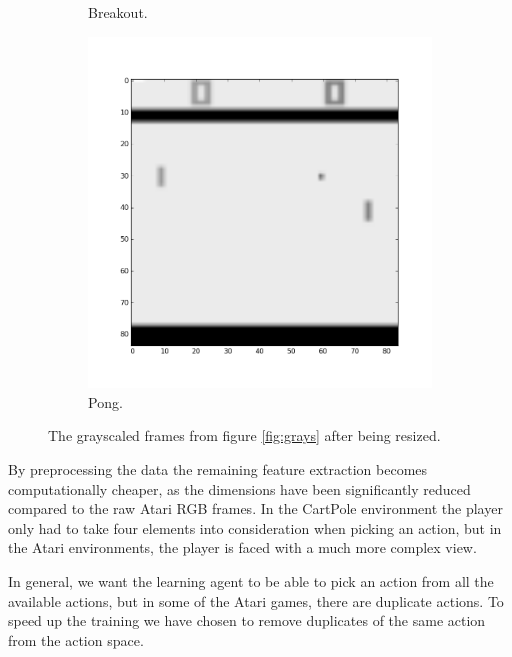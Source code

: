 \documentclass[11pt]{article}
\begin{document}
\begin{figure}[H]
\begin{subfigure}{.3\textwidth}
        \caption{Breakout.}
        \label{fig:scanlike}
    \end{subfigure}
    \begin{subfigure}{.3\textwidth}
        \centering
        \includegraphics[scale=0.23]{include/pong_1_gray_resized.png}
        \caption{Pong.}
        \label{fig:scan}
    \end{subfigure}
    \caption{The grayscaled frames from figure \ref{fig:grays} after being resized.}
     \label{fig:rez}
\end{figure}

By preprocessing the data the remaining feature extraction becomes computationally 
cheaper, as the dimensions have been significantly reduced compared to the raw Atari RGB frames.
In the CartPole environment the player only had to take four elements into consideration when picking an action,
but in the Atari environments, the player is faced with a much more complex view. 

In general, we want the learning agent to be able to pick an action from all
the available actions, but in some of the Atari games, there are duplicate actions.
To speed up the training we have chosen to remove duplicates of the same action
from the action space.
\end{document}
